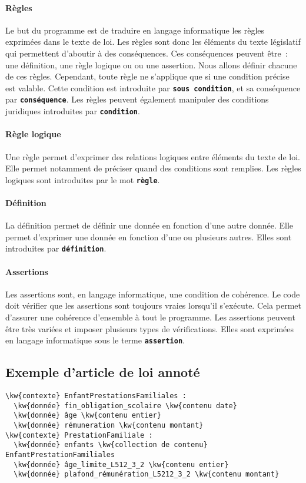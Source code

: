 \documentclass[12pt, french]{article}
\newcommand{\kw}[1]{\textbf{\textcolor{OliveGreen}{#1}}}
\newcommand{\inlinekw}[1]{\kw{\texttt{#1}}}
\newenvironment{metadata}{
  \begin{tcolorbox}[colframe=OliveGreen, title=\textcolor{black}{\texttt{Métadonnées}}, before skip=1em, after skip=1em]
}{
\end{tcolorbox}
}
\begin{document}
\paragraph{Règles} Le but du programme est de traduire en langage informatique les règles exprimées dans le texte de loi. Les règles sont donc les éléments du texte législatif qui permettent d’aboutir à des conséquences. Ces conséquences peuvent être : une définition, une règle logique ou  ou une assertion. Nous allons définir chacune de ces règles. Cependant, toute règle ne s’applique que si une condition précise est valable. Cette condition est introduite par \inlinekw{sous condition}, et sa conséquence par \inlinekw{conséquence}. Les règles peuvent également manipuler des conditions juridiques introduites par \inlinekw{condition}.

\paragraph{Règle logique} Une règle permet d’exprimer des relations logiques entre éléments du texte de loi. Elle permet notamment de préciser quand des conditions sont remplies. Les règles logiques sont introduites par le mot \inlinekw{règle}.

\paragraph{Définition} La définition permet de définir une donnée en fonction d’une autre donnée. Elle permet d’exprimer une donnée en fonction d’une ou plusieurs autres. Elles sont introduites par \inlinekw{définition}.

\paragraph{Assertions} Les assertions sont, en langage informatique, une condition de cohérence. Le code doit vérifier que les assertions sont toujours vraies lorsqu’il s’exécute. Cela permet d’assurer une cohérence d’ensemble à tout le programme. Les assertions peuvent être très variées et imposer plusieurs types de vérifications. Elles sont exprimées en langage informatique sous le terme \inlinekw{assertion}.

\subsection{Exemple d'article de loi annoté}

\begin{metadata}
\begin{Verbatim}[commandchars=\\\{\}]
\kw{contexte} EnfantPrestationsFamiliales :
  \kw{donnée} fin_obligation_scolaire \kw{contenu date}
  \kw{donnée} âge \kw{contenu entier}
  \kw{donnée} rémuneration \kw{contenu montant}
\kw{contexte} PrestationFamiliale :
  \kw{donnée} enfants \kw{collection de contenu} EnfantPrestationFamiliales
  \kw{donnée} âge_limite_L512_3_2 \kw{contenu entier}
  \kw{donnée} plafond_rémunération_L5212_3_2 \kw{contenu montant}
\end{Verbatim}
\end{metadata}
\end{document}
